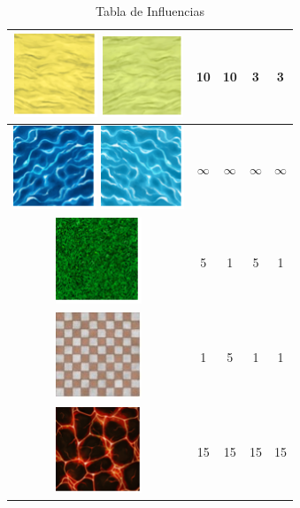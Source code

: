 \begin{table}[H]
\begin{tabular}{|c|c|c|c|c|}
        \hline
        \includegraphics{imagesTable/arena} \includegraphics{imagesTable/claroArena} & 10 & 10 & 3 & 3 \\
        \hline
        \includegraphics{imagesTable/agua} \includegraphics{imagesTable/claroAgua} & $\infty$ & $\infty$  & $\infty$ & $\infty$ \\
        \hline
        \includegraphics{imagesTable/hierba} & 5 & 1 & 5 & 1 \\
        \hline
        \includegraphics[scale=0.33]{imagesTable/suelo} & 1 & 5 & 1 & 1 \\
        \hline
        \includegraphics{imagesTable/lava} & 15 & 15 & 15 & 15 \\
        \hline
    \end{tabular}
    \caption{Tabla de Influencias}
\end{table}

